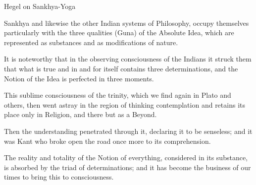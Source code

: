Hegel on Sankhya-Yoga

Sankhya and likewise the other Indian systems of Philosophy,
occupy themselves particularly with the three qualities (Guna)
of the Absolute Idea, which are represented as substances
and as modifications of nature.

It is noteworthy that in the observing consciousness of the Indians
it struck them that what is true and in and for itself
contains three determinations,
and the Notion of the Idea is perfected in three moments.

This sublime consciousness of the trinity,
which we find again in Plato and others,
then went astray in the region of thinking contemplation
and retains its place only in Religion,
and there but as a Beyond.

Then the understanding penetrated through it,
declaring it to be senseless;
and it was Kant who broke open the road once more
to its comprehension.

The reality and totality of the Notion of everything,
considered in its substance, is absorbed
by the triad of determinations;
and it has become the business of our times
to bring this to consciousness.
